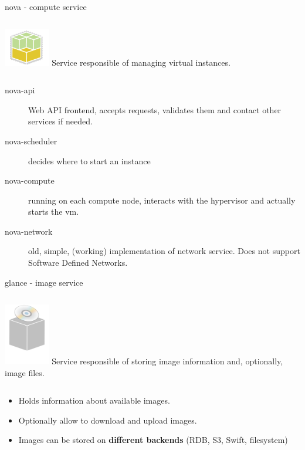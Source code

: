 \documentclass[english,serif,mathserif,usenames,dvipsnames]{beamer}
\begin{document}
\begin{frame}
  {nova - compute service}
  \begin{columns}
    \column{2cm}
    \includegraphics[width=2cm]{openstack-compute-icon.png}
    \column{8cm}
    Service responsible of managing virtual instances.
  \end{columns}
  \begin{description}
  \item[nova-api] Web API frontend, accepts requests, validates them
    and contact other services if needed.
  \item[nova-scheduler] decides where to start an instance
  \item[nova-compute] running on each compute node, interacts with the
    hypervisor and actually starts the vm.
  \item[nova-network] old, simple, (working) implementation of network
    service. Does not support Software Defined Networks.
  \end{description}
\end{frame}

\begin{frame}
  {glance - image service}
  \begin{columns}
    \column{2cm}
    \includegraphics[width=2cm]{glance-icon.png}
    \column{8cm}
    Service responsible of storing image information and, optionally,
    image files.
  \end{columns}

  \+
  \begin{itemize}
  \item Holds information about available images.
  \item Optionally allow to download and upload images.
  \item Images can be stored on \textbf{different backends} (RDB, S3,
    Swift, filesystem)
  \end{itemize}
\end{frame}
\end{document}
